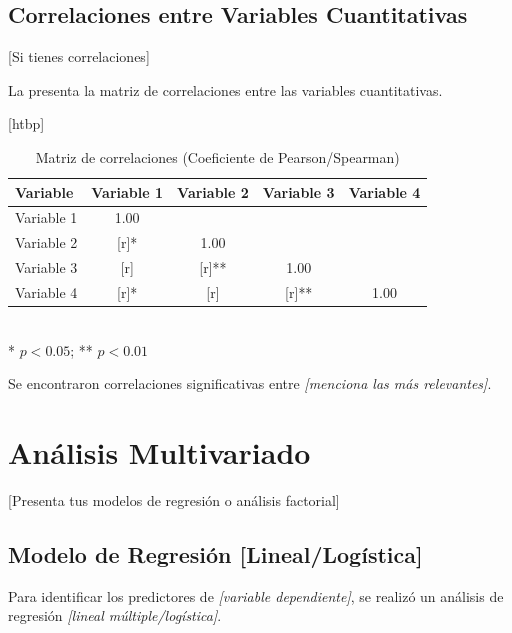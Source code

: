\subsection{Correlaciones entre Variables Cuantitativas}
\label{subsec:correlaciones}

{[Si tienes correlaciones]}

La  presenta la matriz de correlaciones entre las variables cuantitativas.

\begin{table}{[htbp]}
    \centering
    \caption{Matriz de correlaciones (Coeficiente de Pearson/Spearman)}
    \label{tab:matriz_correlaciones}
    \begin{tabular}{@{}lcccc@{}}
        \toprule
        \textbf{Variable} & \textbf{Variable 1} & \textbf{Variable 2} & \textbf{Variable 3} & \textbf{Variable 4} \\
        \midrule
        Variable 1 & 1.00 & & & \\
        Variable 2 & {[r]}* & 1.00 & & \\
        Variable 3 & {[r]} & {[r]}** & 1.00 & \\
        Variable 4 & {[r]}* & {[r]} & {[r]}** & 1.00 \\
        \bottomrule
    \end{tabular}
    \\[5pt]
    \footnotesize{* $p < 0.05$; ** $p < 0.01$}
\end{table}

Se encontraron correlaciones significativas entre \textit{{[menciona las más relevantes]}}.

\section{Análisis Multivariado}
\label{sec:analisis_multivariado}

{[Presenta tus modelos de regresión o análisis factorial]}

\subsection{Modelo de Regresión {[Lineal/Logística]}}
\label{subsec:regresion}

Para identificar los predictores de \textit{{[variable dependiente]}}, se realizó un análisis de regresión \textit{{[lineal múltiple/logística]}}.

